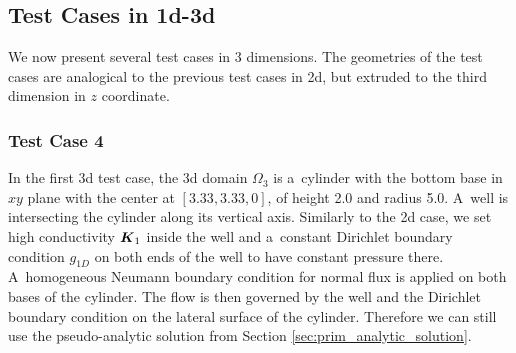 %
%
\pagebreak

\subsection{Test Cases in 1d-3d}
We now present several test cases in 3 dimensions. The geometries of the test cases
are analogical to the previous test cases in 2d, but extruded to the third dimension in $z$ coordinate.

\subsubsection{Test Case 4}
In the first 3d test case, the 3d domain $\Omega_3$ is a~cylinder with the bottom base in $xy$ plane
with the center at $[3.33,3.33,0]$, of height 2.0 and radius 5.0.
A~well is intersecting the cylinder along its vertical axis.
Similarly to the 2d case, we set high conductivity $\mathbf{\boldsymbol{K}}_1$ inside the well
and a~constant Dirichlet boundary condition $g_{1D}$ on both ends of the well to have constant pressure there.
A~homogeneous Neumann boundary condition for normal flux is applied on both bases of the cylinder. The flow is then governed 
by the well and the Dirichlet boundary condition on the lateral surface of the cylinder.
Therefore we can still use the pseudo-analytic solution from Section \ref{sec:prim_analytic_solution}.

